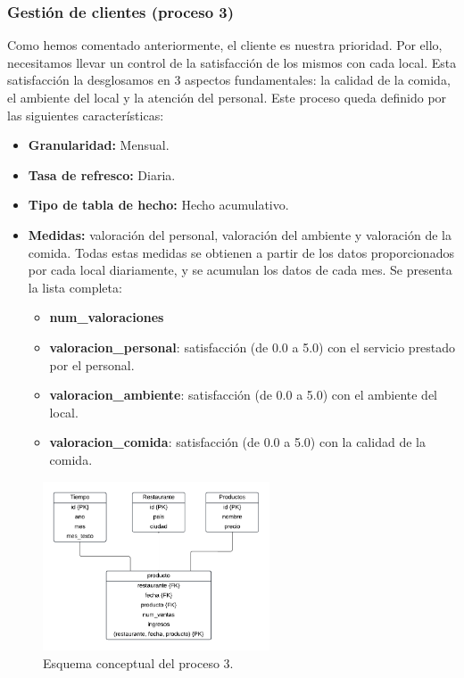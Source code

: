 \documentclass[12pt]{opticajnl}
\begin{document}
\subsubsection{Gestión de clientes (proceso 3)}

Como hemos comentado anteriormente, el cliente es nuestra prioridad. Por ello, necesitamos llevar un control de la satisfacción de los mismos con cada local. Esta satisfacción la desglosamos en 3 aspectos fundamentales: la calidad de la comida, el ambiente del local y la atención del personal. Este proceso queda definido por las siguientes características:
\begin{itemize}
\item \textbf{Granularidad:} Mensual.
\item \textbf{Tasa de refresco:} Diaria.
\item \textbf{Tipo de tabla de hecho:} Hecho acumulativo.
\item \textbf{Medidas:} valoración del personal, valoración del ambiente y valoración de la comida. Todas estas medidas se obtienen a partir de los datos proporcionados por cada local diariamente, y se acumulan los datos de cada mes. Se presenta la lista completa:
\begin{itemize}
\item \textbf{num\_valoraciones}
\item \textbf{valoracion\_personal}: satisfacción (de 0.0 a 5.0) con el servicio prestado por el personal.
\item \textbf{valoracion\_ambiente}: satisfacción (de 0.0 a 5.0) con el ambiente del local.
\item \textbf{valoracion\_comida}: satisfacción (de 0.0 a 5.0) con la calidad de la comida.
\end{itemize}
\end{itemize}

\begin{figure}[H]
\centering
\includegraphics[width=0.6\textwidth]{fotos/feed.pdf}
\caption{Esquema conceptual del proceso 3.}
\label{fig:esquema_proceso3}
\end{figure}
\end{document}
